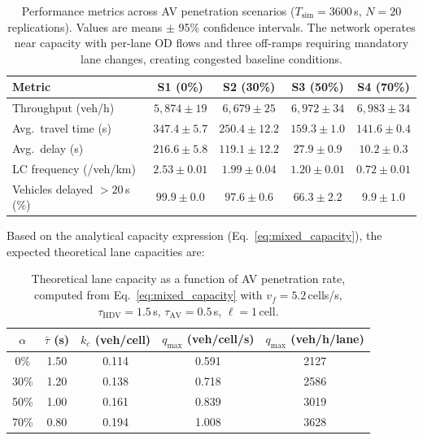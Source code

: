 \documentclass[review,authoryear]{elsarticle}
\begin{document}
\begin{table}[ht]
\centering
\caption{Performance metrics across AV penetration scenarios ($T_{\text{sim}} = 3600$\,s, $N = 20$ replications). Values are means $\pm$ 95\% confidence intervals. The network operates near capacity with per-lane OD flows and three off-ramps requiring mandatory lane changes, creating congested baseline conditions.}
\label{tab:results_mixed}
\begin{tabular}{@{}lcccc@{}}
\toprule
Metric & S1 (0\%) & S2 (30\%) & S3 (50\%) & S4 (70\%) \\
\midrule
Throughput (veh/h) & $5{,}874 \pm 19$ & $6{,}679 \pm 25$ & $6{,}972 \pm 34$ & $6{,}983 \pm 34$ \\
Avg.\ travel time (s) & $347.4 \pm 5.7$ & $250.4 \pm 12.2$ & $159.3 \pm 1.0$ & $141.6 \pm 0.4$ \\
Avg.\ delay (s) & $216.6 \pm 5.8$ & $119.1 \pm 12.2$ & $27.9 \pm 0.9$ & $10.2 \pm 0.3$ \\
LC frequency (/veh/km) & $2.53 \pm 0.01$ & $1.99 \pm 0.04$ & $1.20 \pm 0.01$ & $0.72 \pm 0.01$ \\
Vehicles delayed $>20$\,s (\%) & $99.9 \pm 0.0$ & $97.6 \pm 0.6$ & $66.3 \pm 2.2$ & $9.9 \pm 1.0$ \\
\bottomrule
\end{tabular}
\end{table}

Based on the analytical capacity expression (Eq.~\ref{eq:mixed_capacity}), the expected theoretical lane capacities are:

\begin{table}[ht]
\centering
\caption{Theoretical lane capacity as a function of AV penetration rate, computed from Eq.~\eqref{eq:mixed_capacity} with $v_f = 5.2$\,cells/s, $\tau_{\text{HDV}} = 1.5$\,s, $\tau_{\text{AV}} = 0.5$\,s, $\ell = 1$\,cell.}
\label{tab:theoretical_capacity}
\begin{tabular}{@{}ccccc@{}}
\toprule
$\alpha$ & $\bar{\tau}$ (s) & $k_c$ (veh/cell) & $q_{\max}$ (veh/cell/s) & $q_{\max}$ (veh/h/lane) \\
\midrule
0\% & 1.50 & 0.114 & 0.591 & 2127 \\
30\% & 1.20 & 0.138 & 0.718 & 2586 \\
50\% & 1.00 & 0.161 & 0.839 & 3019 \\
70\% & 0.80 & 0.194 & 1.008 & 3628 \\
\bottomrule
\end{tabular}
\end{table}
\end{document}
